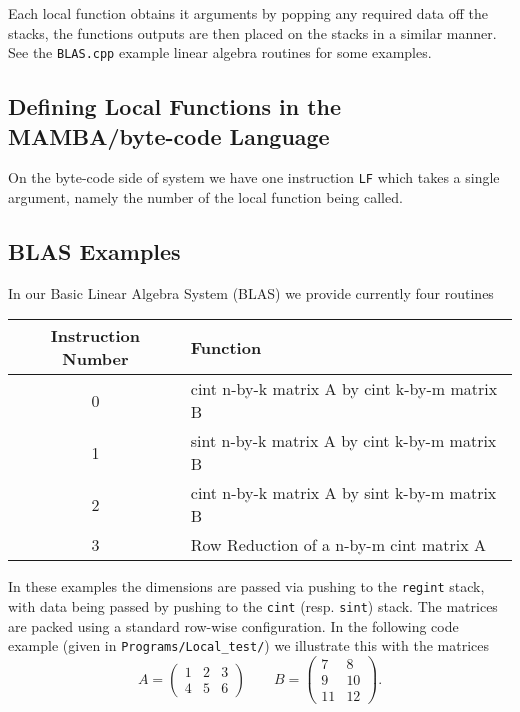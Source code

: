 Each local function obtains it arguments by popping any required
data off the stacks, the functions outputs are then placed on the
stacks in a similar manner.
See the \verb|BLAS.cpp| example linear algebra routines for
some examples.

\subsection{Defining Local Functions in the MAMBA/byte-code Language} 
On the byte-code side of system we have one instruction
\verb|LF| which takes a single argument, namely the
number of the local function being called.

\subsection{BLAS Examples}
In our Basic Linear Algebra System (BLAS) we provide currently four
routines
\begin{center}
\begin{tabular}{c|l}
Instruction Number & Function \\
\hline
0 & cint n-by-k matrix A by cint k-by-m matrix B \\
1 & sint n-by-k matrix A by cint k-by-m matrix B \\
2 & cint n-by-k matrix A by sint k-by-m matrix B \\
3 & Row Reduction of a n-by-m cint matrix A \\
\end{tabular}
\end{center}
In these examples the dimensions are passed via 
pushing to the \verb|regint| stack, with data
being passed by pushing to the \verb|cint| (resp.
\verb|sint|) stack.
The matrices are packed using a standard row-wise configuration.
In the following code example (given in \verb|Programs/Local_test/|)
we illustrate this with the matrices
\[
  A = \left( \begin{array}{ccc}
  1 & 2 & 3 \\  
  4 & 5 & 6 \end{array} \right) \quad \quad
  B = \left( \begin{array}{cc}
  7 & 8 \\
  9 & 10 \\
  11 & 12 
  \end{array} \right).
\]
